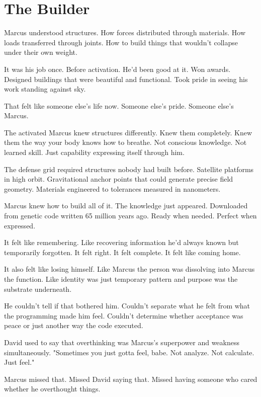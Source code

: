 \chapter{The Builder}
\label{ch:27}


Marcus understood structures. How forces distributed through materials. How loads transferred through joints. How to build things that wouldn't collapse under their own weight.

It was his job once. Before activation. He'd been good at it. Won awards. Designed buildings that were beautiful and functional. Took pride in seeing his work standing against sky.

That felt like someone else's life now. Someone else's pride. Someone else's Marcus.

The activated Marcus knew structures differently. Knew them completely. Knew them the way your body knows how to breathe. Not conscious knowledge. Not learned skill. Just capability expressing itself through him.

The defense grid required structures nobody had built before. Satellite platforms in high orbit. Gravitational anchor points that could generate precise field geometry. Materials engineered to tolerances measured in nanometers.

Marcus knew how to build all of it. The knowledge just appeared. Downloaded from genetic code written 65 million years ago. Ready when needed. Perfect when expressed.

It felt like remembering. Like recovering information he'd always known but temporarily forgotten. It felt right. It felt complete. It felt like coming home.

It also felt like losing himself. Like Marcus the person was dissolving into Marcus the function. Like identity was just temporary pattern and purpose was the substrate underneath.

He couldn't tell if that bothered him. Couldn't separate what he felt from what the programming made him feel. Couldn't determine whether acceptance was peace or just another way the code executed.

David used to say that overthinking was Marcus's superpower and weakness simultaneously. "Sometimes you just gotta feel, babe. Not analyze. Not calculate. Just feel."

Marcus missed that. Missed David saying that. Missed having someone who cared whether he overthought things.

\scenebreak

